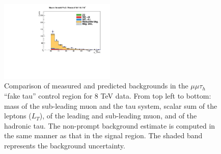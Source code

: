 \begin{figure}
\begin{center}
  \includegraphics[width=0.49\textwidth]{4_Analisys/pics/8TeV/plots/mmt/f3/Full/final-f3-tPt-Full.pdf}
  \caption{Comparison of measured and predicted backgrounds in the $\mu\mu\tau_h$ ``fake tau'' control region for 8 TeV data.
  From top left to bottom: mass of the sub-leading muon and the tau system, scalar sum of the leptons \pT ($L_T$), \pT of the leading and sub-leading muon, and \pT of the hadronic tau.
  The non-prompt background estimate is computed in the same manner as that in the signal region.
  The shaded band represents the background uncertainty.
  }
  \label{fig:LLT_mmt_f3_control_8TeV}
\end{center}
\end{figure}

